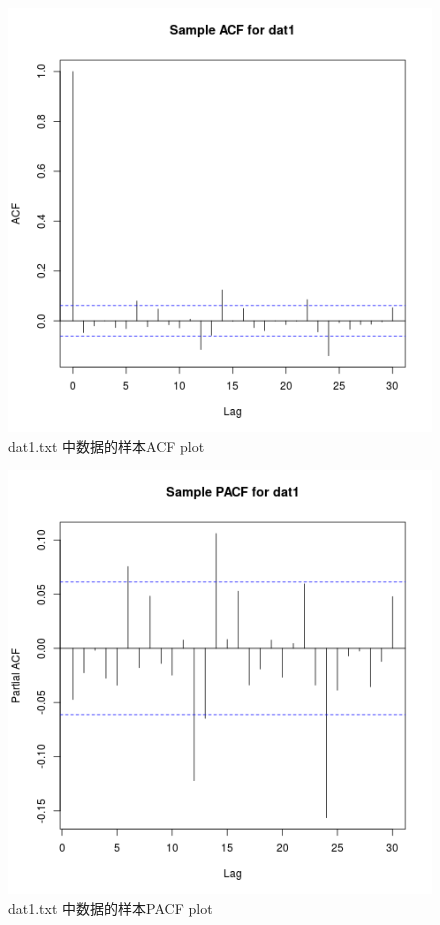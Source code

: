 \documentclass[11pt]{article}
\begin{document}
\begin{figure}[h]
	\centering
	\includegraphics[scale=0.4]{dat1_acf.png}
	\caption{dat1.txt 中数据的样本ACF plot}
\label{dat1_acf}
\end{figure}

\begin{figure}[h]
	\centering
	\includegraphics[scale=0.4]{dat1_pacf.png}
	\caption{dat1.txt 中数据的样本PACF plot}
\label{dat1_pacf}
\end{figure}
\end{document}
